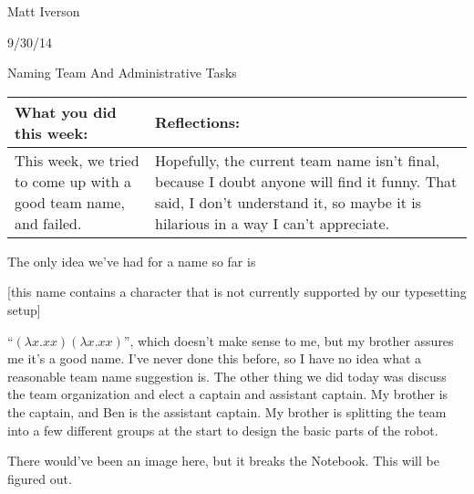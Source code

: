 Matt Iverson

9/30/14

Naming Team And Administrative Tasks

\begin{tabular}{|p{5cm}|p{5cm}|}
 \hline
 What you did this week: &
 Reflections: \\
 \hline
 This week, we tried to come up with a good team name, and failed. &
 Hopefully, the current team name isn’t final, because I doubt anyone will find it funny. That said, I don’t understand it, so maybe it is hilarious in a way I can’t appreciate. \\
 \hline
\end{tabular}

The only idea we’ve had for a name so far is

[this name contains a character that is not currently supported by our typesetting setup]

“$(\lambda x.xx)(\lambda x.xx)$”,
which doesn’t make sense to me, but my brother assures me it’s a good name. I’ve never done this before, so I have no idea what a reasonable team name suggestion is.
	The other thing we did today was discuss the team organization and elect a captain and assistant captain. My brother is the captain, and Ben is the assistant captain. My brother is splitting the team into a few different groups at the start to design the basic parts of the robot.

There would've been an image here, but it breaks the Notebook. This will be figured out.
